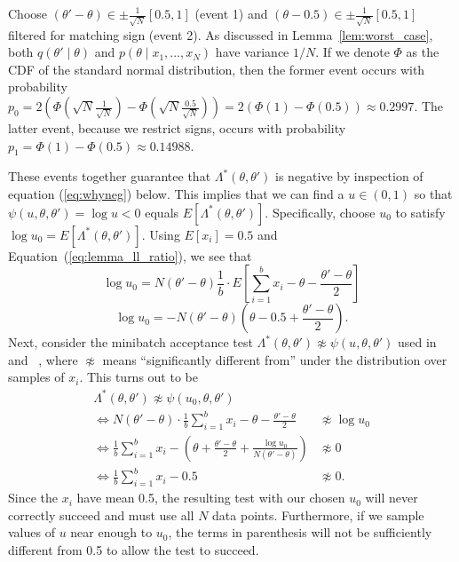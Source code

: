 \documentclass[twoside]{article} \usepackage{aistats2017}
\begin{document}
Choose $(\theta' - \theta) \in \pm\frac{1}{\sqrt{N}}[0.5,1]$ (event 1) and $(\theta -0.5)
\in \pm\frac{1}{\sqrt{N}}[0.5,1]$ filtered for  matching sign (event 2).  As
discussed in Lemma~\ref{lem:worst_case}, both $q(\theta' \mid \theta)$ and
$p(\theta \mid x_1,\ldots,x_N)$ have variance $1/N$. If we denote $\Phi$ as the
CDF of the standard normal distribution, then the former event occurs with
probability $p_0 = 2(\Phi(\sqrt{N}\frac{1}{\sqrt{N}}) -
\Phi(\sqrt{N}\frac{0.5}{\sqrt{N}})) = 2(\Phi(1)-\Phi(0.5)) \approx 0.2997$. The
latter event, because we restrict signs, occurs with probability $p_1 =
\Phi(1) - \Phi(0.5) \approx 0.14988$. 

These events together guarantee that $\Lambda^*(\theta,\theta')$ is negative
by inspection of equation (\ref{eq:whyneg}) below.
This implies that we can find a $u \in (0,1)$ so that
$\psi(u,\theta,\theta') = \log u < 0$ equals $E[\Lambda^*(\theta,\theta')]$.
Specifically, choose $u_0$ to satisfy $\log u_0 = E[\Lambda^*(\theta,\theta')]$.
Using $E[x_i] = 0.5$ and Equation~(\ref{eq:lemma_ll_ratio}), we see that
\begin{equation}
  \log u_0 = N(\theta'-\theta)\frac{1}{b} \cdot E\left[\sum_{i=1}^b x_i-\theta-\frac{\theta'-\theta}{2}\right]
\end{equation}
\begin{equation}\label{eq:whyneg}
    \log u_0 = -N(\theta'-\theta)\left(\theta-0.5+\frac{\theta'-\theta}{2}\right).
\end{equation}
Next, consider the minibatch acceptance test $\Lambda^*(\theta,\theta') \not\approx
\psi(u,\theta,\theta')$ used in ~\cite{cutting_mh_2014} and~\cite{icml2014c1_bardenet14} , where $\not\approx$
means ``significantly different from'' under the distribution over
samples of $x_i$. This turns out to be
\begin{equation}
\begin{split}
\Lambda^*(\theta,\theta')  \not\approx \psi(u_0,\theta,\theta') & \quad \\
\iff N(\theta'-\theta) \cdot \frac{1}{b}\sum_{i=1}^b x_i-\theta-\frac{\theta'-\theta}{2} & \not\approx \log u_0\\
\iff \frac{1}{b}\sum_{i=1}^b x_i-\left(\theta+\frac{\theta'-\theta}{2} + \frac{\log u_0}{N(\theta'-\theta)}\right) & \not\approx  0 \\
\iff \frac{1}{b}\sum_{i=1}^b x_i-0.5 & \not\approx 0. \label{eq:accept_test_zero}
\end{split}
\end{equation}
Since the $x_i$ have mean 0.5, the resulting test with our chosen $u_0$ will
never correctly succeed and must use all $N$ data points.  Furthermore, if we
sample values of $u$ near enough to $u_0$, the terms in parenthesis will not be
sufficiently different from 0.5 to allow the test to succeed. 
  
\end{document}
